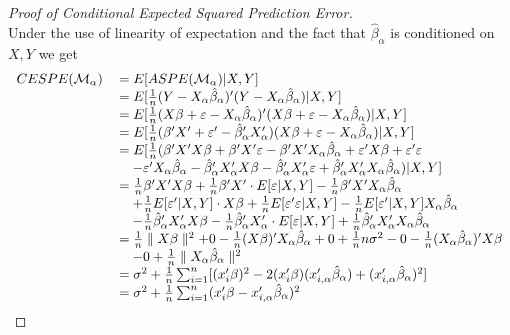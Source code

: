 \documentclass[Research_Module_ES.tex]{subfiles}
\begin{document}
\begin{proof}[Proof of Conditional Expected Squared Prediction Error] ~\\Under the use of linearity of expectation and the fact that $\hat{\beta}_\alpha$ is conditioned on $X,Y$ we get 
	\begin{align*}
	\begin{tabular}{ll}
	$CESPE(\mathcal{M}_\alpha)$&$=E[ASPE(\mathcal{M}_\alpha)|X,Y]$\\
	&$=E[\frac{1}{n}(Y-X_\alpha\hat{\beta}_\alpha)^\prime(Y-X_\alpha\hat{\beta}_\alpha)|X,Y]$\\
	&$=E[\frac{1}{n}(X\beta+\varepsilon-X_\alpha\hat{\beta}_\alpha)^\prime(X\beta+\varepsilon-X_\alpha\hat{\beta}_\alpha)|X,Y]$\\
	&$=E[\frac{1}{n}(\beta^\prime X^\prime+\varepsilon^\prime-\hat{\beta}_\alpha^\prime X_\alpha^\prime)(X\beta+\varepsilon-X_\alpha\hat{\beta}_\alpha)|X,Y]$\\
	&$=E[\frac{1}{n}(\beta^\prime X^\prime X\beta+\beta^\prime X^\prime\varepsilon-\beta^\prime X^\prime X_\alpha\hat{\beta}_\alpha+\varepsilon^\prime X\beta+\varepsilon^\prime\varepsilon$\\&$~~~-\varepsilon^\prime X_\alpha\hat{\beta}_\alpha-\hat{\beta}_\alpha^\prime X_\alpha^\prime X\beta-\hat{\beta}_\alpha^\prime X_\alpha^\prime\varepsilon+\hat{\beta}_\alpha^\prime X_\alpha^\prime X_\alpha\hat{\beta}_\alpha)|X,Y]$\\
	&$=\frac{1}{n}\beta^\prime X^\prime X\beta+\frac{1}{n}\beta^\prime X^\prime\cdot E[\varepsilon|X,Y]-\frac{1}{n}\beta^\prime X^\prime X_\alpha\hat{\beta}_\alpha$\\
	&$~~~+\frac{1}{n}E[\varepsilon^\prime|X,Y]\cdot X\beta+\frac{1}{n}E[\varepsilon^\prime\varepsilon|X,Y]-\frac{1}{n}E[\varepsilon^\prime|X,Y]X_\alpha\hat{\beta}_\alpha$\\
	&$~~~-\frac{1}{n}\hat{\beta}_\alpha^\prime X_\alpha^\prime X\beta-\frac{1}{n}\hat{\beta}_\alpha^\prime X_\alpha^\prime\cdot E[\varepsilon|X,Y]+\frac{1}{n}\hat{\beta}_\alpha^\prime X_\alpha^\prime X_\alpha\hat{\beta}_\alpha$\\
	&$=\frac{1}{n}\parallel X\beta\parallel^2+0-\frac{1}{n} (X\beta)^\prime X_\alpha\hat{\beta}_\alpha+0+\frac{1}{n} n\sigma^2-0-\frac{1}{n}(X_\alpha\hat{\beta}_\alpha)^\prime X\beta$\\
	&$~~~-0+\frac{1}{n}\parallel X_\alpha\hat{\beta}_\alpha\parallel^2$\\
	&$=\sigma^2+\frac{1}{n}\sum_{i=1}^{n}[(x_i^\prime\beta)^2-2(x_i^\prime\beta)(x_{i,\alpha}^\prime\hat{\beta}_\alpha)+(x_{i,\alpha}^\prime\hat{\beta}_\alpha)^2]$\\
	&$=\sigma^2+\frac{1}{n}\sum_{i=1}^{n}(x_i^\prime\beta-x_{i,\alpha}^\prime\hat{\beta}_\alpha)^2$
	\end{tabular}
	\end{align*}
\end{proof}
\end{document}

